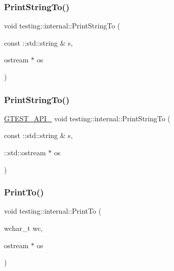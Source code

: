 \mbox{\label{namespacetesting_1_1internal_ad609167d8d6792b0fb186539e0e159bd}} 
\subsubsection{\texorpdfstring{Print\+String\+To()}{PrintStringTo()}\hspace{0.1cm}{\footnotesize\ttfamily [1/2]}}
{\footnotesize\ttfamily void testing\+::internal\+::\+Print\+String\+To (\begin{DoxyParamCaption}\item[{const \+::std\+::string \&}]{s,  }\item[{ostream $\ast$}]{os }\end{DoxyParamCaption})}

\mbox{\label{namespacetesting_1_1internal_a8b53e46cea3f8bdfc9342057c4f6ba62}} 
\subsubsection{\texorpdfstring{Print\+String\+To()}{PrintStringTo()}\hspace{0.1cm}{\footnotesize\ttfamily [2/2]}}
{\footnotesize\ttfamily \hyperlink{gtest-port_8h_aa73be6f0ba4a7456180a94904ce17790}{G\+T\+E\+S\+T\+\_\+\+A\+P\+I\+\_\+} void testing\+::internal\+::\+Print\+String\+To (\begin{DoxyParamCaption}\item[{const \+::std\+::string \&}]{s,  }\item[{\+::std\+::ostream $\ast$}]{os }\end{DoxyParamCaption})}

\mbox{\label{namespacetesting_1_1internal_aa74ea9d64f76ce69eceb225ca5ebef58}} 
\subsubsection{\texorpdfstring{Print\+To()}{PrintTo()}\hspace{0.1cm}{\footnotesize\ttfamily [1/20]}}
{\footnotesize\ttfamily void testing\+::internal\+::\+Print\+To (\begin{DoxyParamCaption}\item[{wchar\+\_\+t}]{wc,  }\item[{ostream $\ast$}]{os }\end{DoxyParamCaption})}

